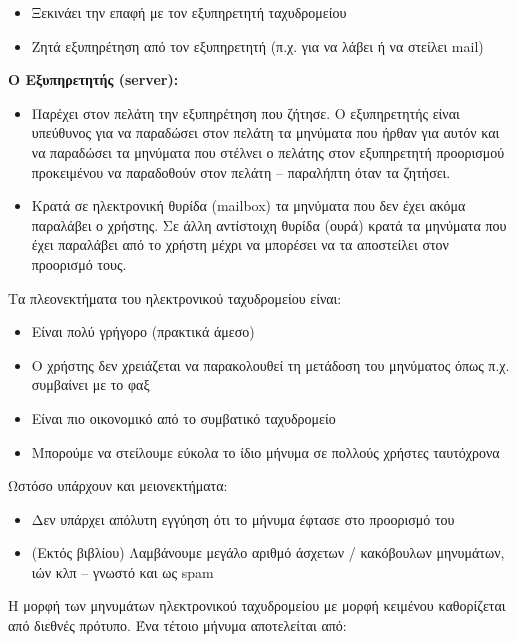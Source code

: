 \begin{itemize}
\item Ξεκινάει την επαφή με τον εξυπηρετητή ταχυδρομείου
\item Ζητά εξυπηρέτηση από τον εξυπηρετητή (π.χ. για να λάβει ή να στείλει mail)
\end{itemize}

\textbf{Ο Εξυπηρετητής (server):}

\begin{itemize}
\item Παρέχει στον πελάτη την εξυπηρέτηση που ζήτησε. Ο εξυπηρετητής είναι υπεύθυνος για να παραδώσει στον πελάτη τα μηνύματα που ήρθαν για αυτόν και να παραδώσει τα μηνύματα που στέλνει ο πελάτης στον εξυπηρετητή προορισμού προκειμένου να παραδοθούν στον πελάτη -- παραλήπτη όταν τα ζητήσει.
\item Κρατά σε ηλεκτρονική θυρίδα (mailbox) τα μηνύματα που δεν έχει ακόμα παραλάβει ο χρήστης. Σε άλλη αντίστοιχη θυρίδα (ουρά) κρατά τα μηνύματα που έχει παραλάβει από το χρήστη μέχρι να μπορέσει να τα αποστείλει στον προορισμό τους.
\end{itemize}

Τα πλεονεκτήματα του ηλεκτρονικού ταχυδρομείου είναι:

\begin{itemize}
\item Είναι πολύ γρήγορο (πρακτικά άμεσο)
\item Ο χρήστης δεν χρειάζεται να παρακολουθεί τη μετάδοση του μηνύματος όπως π.χ. συμβαίνει με το φαξ
\item Είναι πιο οικονομικό από το συμβατικό ταχυδρομείο
\item Μπορούμε να στείλουμε εύκολα το ίδιο μήνυμα σε πολλούς χρήστες ταυτόχρονα
\end{itemize}

Ωστόσο υπάρχουν και μειονεκτήματα:

\begin{itemize}
\item Δεν υπάρχει απόλυτη εγγύηση ότι το μήνυμα έφτασε στο προορισμό του
\item (Εκτός βιβλίου) Λαμβάνουμε μεγάλο αριθμό άσχετων / κακόβουλων μηνυμάτων, ιών κλπ -- γνωστό και ως spam
\end{itemize}

Η μορφή των μηνυμάτων ηλεκτρονικού ταχυδρομείου με μορφή κειμένου καθορίζεται από διεθνές πρότυπο. Ένα τέτοιο μήνυμα αποτελείται από:


